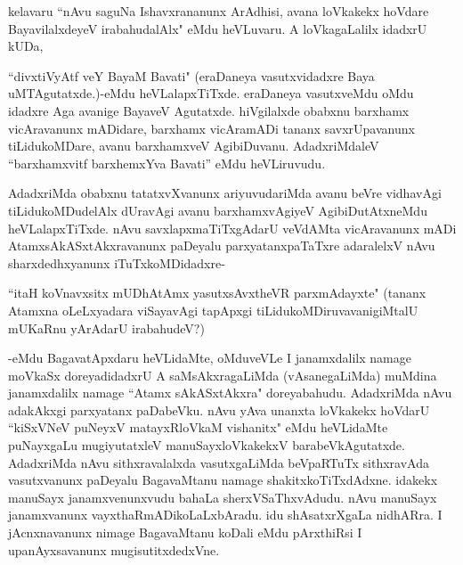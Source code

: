 kelavaru ``nAvu saguNa Ishavxrananunx ArAdhisi, avana loVkakekx hoVdare BayavilalxdeyeV irabahudalAlx" eMdu heVLuvaru. A loVkagaLalilx idadxrU kUDa,

``divxtiVyAtf veY BayaM Bavati" (eraDaneya vasutxvidadxre Baya uMTAgutatxde.)-eMdu heVLalapxTiTxde. eraDaneya vasutxveMdu oMdu idadxre Aga avanige BayaveV Agutatxde. hiVgilalxde obabxnu barxhamx vicAravanunx mADidare, barxhamx vicAramADi tananx savxrUpavanunx tiLidukoMDare, avanu barxhamxveV AgibiDuvanu. AdadxriMdaleV ``barxhamxvitf barxhemxYva Bavati'' eMdu heVLiruvudu.

AdadxriMda obabxnu tatatxvXvanunx ariyuvudariMda avanu beVre vidhavAgi tiLidukoMDudelAlx dUravAgi avanu barxhamxvAgiyeV AgibiDutAtxneMdu heVLalapxTiTxde. nAvu savxlapxmaTiTxgAdarU veVdAMta vicAravanunx mADi AtamxsAkASxtAkxravanunx paDeyalu parxyatanxpaTaTxre adaralelxV nAvu sharxdedhxyanunx iTuTxkoMDidadxre-

``itaH koVnavxsitx mUDhAtAmx yasutxsAvxtheVR parxmAdayxte" (tananx Atamxna oLeLxyadara viSayavAgi tapApxgi tiLidukoMDiruvavanigiMtalU mUKaRnu yArAdarU irabahudeV?)

-eMdu BagavatApxdaru heVLidaMte, oMduveVLe I janamxdalilx namage moVkaSx doreyadidadxrU A saMsAkxragaLiMda (vAsanegaLiMda) muMdina janamxdalilx namage ``Atamx sAkASxtAkxra" doreyabahudu. AdadxriMda nAvu adakAkxgi parxyatanx paDabeVku. nAvu yAva unanxta loVkakekx hoVdarU ``kiSxVNeV puNeyxV matayxRloVkaM vishanitx" eMdu heVLidaMte puNayxgaLu mugiyutatxleV manuSayxloVkakekxV barabeVkAgutatxde. AdadxriMda nAvu sithxravalalxda vasutxgaLiMda beVpaRTuTx sithxravAda vasutxvanunx paDeyalu BagavaMtanu namage shakitxkoTiTxdAdxne. idakekx manuSayx janamxvenunxvudu bahaLa sherxVSaThxvAdudu. nAvu manuSayx janamxvanunx vayxthaRmADikoLaLxbAradu. idu shAsatxrXgaLa nidhARra. I jAcnxnavanunx nimage BagavaMtanu koDali eMdu pArxthiRsi I upanAyxsavanunx mugisutitxdedxVne.


\endchapter
